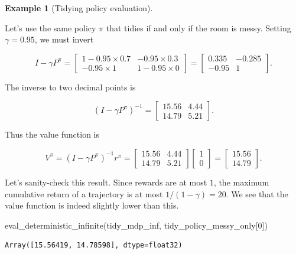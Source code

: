 \documentclass[
  letterpaper,
  DIV=11,
  numbers=noendperiod]{scrreprt}
\newenvironment{Shaded}{\begin{snugshade}}{\end{snugshade}}
\newcommand{\DecValTok}[1]{\textcolor[rgb]{0.68,0.00,0.00}{#1}}
\newcommand{\NormalTok}[1]{\textcolor[rgb]{0.00,0.23,0.31}{#1}}
\theoremstyle{plain}
\theoremstyle{plain}
\theoremstyle{definition}
\newtheorem{example}{Example}[chapter]
\theoremstyle{definition}
\theoremstyle{remark}
\begin{document}
\begin{example}[Tidying policy
evaluation]\protect\hypertarget{exm-tidy_eval_infinite}{}\label{exm-tidy_eval_infinite}

Let's use the same policy \(\pi\) that tidies if and only if the room is
messy. Setting \(\gamma = 0.95\), we must invert

\[I - \gamma P^{\pi} = \begin{bmatrix} 1 - 0.95 \times 0.7 & - 0.95 \times 0.3 \\ - 0.95 \times 1 & 1 - 0.95 \times 0 \end{bmatrix} = \begin{bmatrix} 0.335 & -0.285 \\ -0.95 & 1 \end{bmatrix}.\]

The inverse to two decimal points is

\[(I - \gamma P^{\pi})^{-1} = \begin{bmatrix} 15.56 & 4.44 \\ 14.79 & 5.21 \end{bmatrix}.\]

Thus the value function is

\[V^{\pi} = (I - \gamma P^{\pi})^{-1} r^{\pi} = \begin{bmatrix} 15.56 & 4.44 \\ 14.79 & 5.21 \end{bmatrix} \begin{bmatrix} 1 \\ 0 \end{bmatrix} = \begin{bmatrix} 15.56 \\ 14.79 \end{bmatrix}.\]

Let's sanity-check this result. Since rewards are at most \(1\), the
maximum cumulative return of a trajectory is at most
\(1/(1-\gamma) = 20\). We see that the value function is indeed slightly
lower than this.

\end{example}

\begin{Shaded}
\begin{Highlighting}[]
\NormalTok{eval\_deterministic\_infinite(tidy\_mdp\_inf, tidy\_policy\_messy\_only[}\DecValTok{0}\NormalTok{])}
\end{Highlighting}
\end{Shaded}

\begin{verbatim}
Array([15.56419, 14.78598], dtype=float32)
\end{verbatim}
\end{document}
